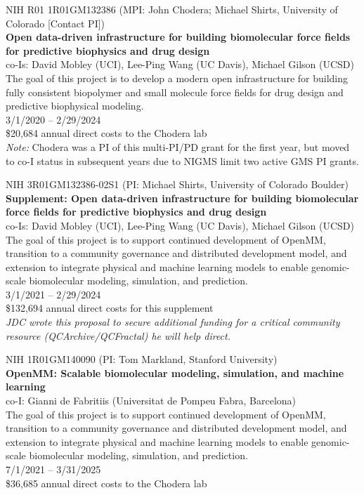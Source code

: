 \documentclass[10pt]{article}
\begin{document}
\vspace{1.5ex}

NIH R01 1R01GM132386 (MPI: John Chodera; Michael Shirts, University of Colorado [Contact PI]) \\
{\bf Open data-driven infrastructure for building biomolecular force fields for predictive biophysics and drug design} \\
co-Is: David Mobley (UCI), Lee-Ping Wang (UC Davis), Michael Gilson (UCSD) \\
The goal of this project is to develop a modern open infrastructure for building fully consistent biopolymer and small molecule force fields for drug design and predictive biophysical modeling. \\
3/1/2020 -- 2/29/2024 \\
\$20,684 annual direct costs to the Chodera lab\\
\emph{Note:} Chodera was a PI of this multi-PI/PD grant for the first year, but moved to co-I status in subsequent years due to NIGMS limit two active GMS PI grants.

\vspace{1.5ex}

NIH 3R01GM132386-02S1 (PI: Michael Shirts, University of Colorado Boulder)\\
{\bf Supplement: Open data-driven infrastructure for building biomolecular force fields for predictive biophysics and drug design}\\
co-Is: David Mobley (UCI), Lee-Ping Wang (UC Davis), Michael Gilson (UCSD) \\
The goal of this project is to support continued development of OpenMM, transition to a community governance and distributed development model, and extension to integrate physical and machine learning models to enable genomic-scale biomolecular modeling, simulation, and prediction.\\
3/1/2021 -- 2/29/2024\\
\$132,694 annual direct costs for this supplement\\
\emph{JDC wrote this proposal to secure additional funding for a critical community resource (QCArchive/QCFractal) he will help direct.}

\vspace{1.5ex}

NIH 1R01GM140090 (PI: Tom Markland, Stanford University)\\
{\bf OpenMM: Scalable biomolecular modeling, simulation, and machine learning}\\
co-I: Gianni de Fabritiis (Universitat de Pompeu Fabra, Barcelona)\\
The goal of this project is to support continued development of OpenMM, transition to a community governance and distributed development model, and extension to integrate physical and machine learning models to enable genomic-scale biomolecular modeling, simulation, and prediction.\\
7/1/2021 -- 3/31/2025\\
\$36,685 annual direct costs to the Chodera lab
\end{document}
